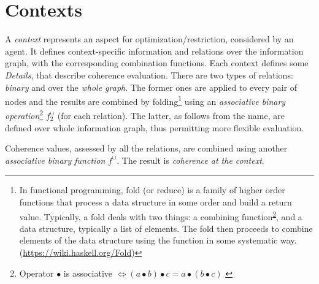 \documentclass[../ThesisDoc]{subfiles}
\begin{document}
\providecommand{\rootdir}{..}


\section{Contexts}
\label{sec:solution-contexts}


A \emph{context} represents an aspect for optimization/restriction, considered
by an agent. It defines context-specific information and relations over the
information graph, with the corresponding combination functions.
Each context defines some \emph{Details}, that describe coherence evaluation.
There are two types of relations: \emph{binary} and over the \emph{whole graph}.
The former ones are applied to every pair of nodes and the results are combined
by folding\footnote{
  In functional programming, fold (or reduce) is a family of higher order
  functions that process a data structure in some order and build a return value.
  Typically, a fold deals with two things: a combining
  function\textsuperscript{\ref{footnote:binary-operation}},
  and a data structure, typically a list of elements.
  The fold then proceeds to combine elements of the data structure using
  the function in some systematic way. (\url{https://wiki.haskell.org/Fold})
} using an \emph{associative binary operation}\footnote{%
  Operator $\bullet$ is associative
  $\Leftrightarrow (a \bullet b) \bullet c = a \bullet (b \bullet c)$
    \label{footnote:binary-operation}
} $f^\cup_2$ (for each relation).
The latter, as follows from the name, are defined over whole information graph,
thus permitting more flexible evaluation.

Coherence values, assessed by all the relations, are combined using another
\emph{associative binary function} $f^\cup$.
The result is \emph{coherence at the context}.
\end{document}
